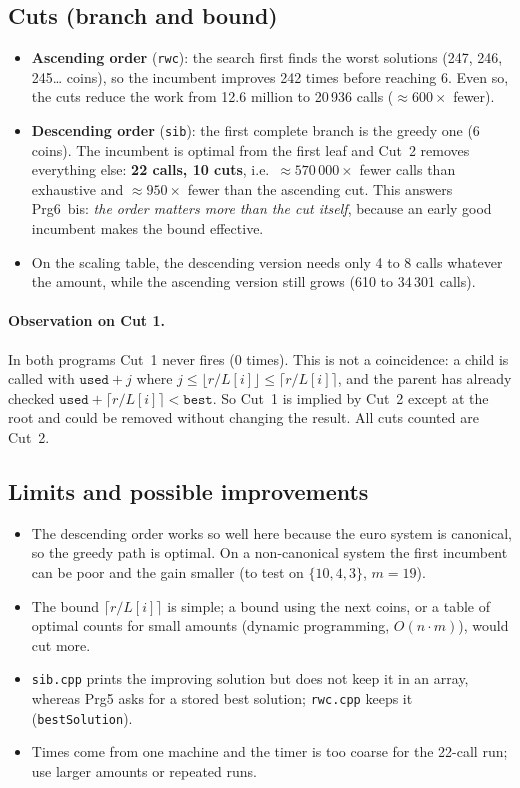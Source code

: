 \documentclass[11pt,a4paper]{article}
\begin{document}
\subsection{Cuts (branch and bound)}
\begin{itemize}
  \item \textbf{Ascending order} (\texttt{rwc}): the search first finds the worst solutions (247, 246, 245\dots{} coins), so the incumbent improves 242 times before reaching 6. Even so, the cuts reduce the work from 12.6 million to 20\,936 calls ($\approx 600\times$ fewer).
  \item \textbf{Descending order} (\texttt{sib}): the first complete branch is the greedy one (6 coins). The incumbent is optimal from the first leaf and Cut~2 removes everything else: \textbf{22 calls, 10 cuts}, i.e.\ $\approx 570\,000\times$ fewer calls than exhaustive and $\approx 950\times$ fewer than the ascending cut. This answers Prg6~bis: \emph{the order matters more than the cut itself}, because an early good incumbent makes the bound effective.
  \item On the scaling table, the descending version needs only 4 to 8 calls whatever the amount, while the ascending version still grows (610 to 34\,301 calls).
\end{itemize}

\paragraph{Observation on Cut 1.} In both programs Cut~1 never fires (0 times). This is not a coincidence: a child is called with $\texttt{used}+j$ where $j\le\lfloor r/L[i]\rfloor\le\lceil r/L[i]\rceil$, and the parent has already checked $\texttt{used}+\lceil r/L[i]\rceil<\texttt{best}$. So Cut~1 is implied by Cut~2 except at the root and could be removed without changing the result. All cuts counted are Cut~2.

\subsection{Limits and possible improvements}
\begin{itemize}
  \item The descending order works so well here because the euro system is canonical, so the greedy path is optimal. On a non-canonical system the first incumbent can be poor and the gain smaller (to test on $\{10,4,3\}$, $m=19$).
  \item The bound $\lceil r/L[i]\rceil$ is simple; a bound using the next coins, or a table of optimal counts for small amounts (dynamic programming, $O(n\cdot m)$), would cut more.
  \item \texttt{sib.cpp} prints the improving solution but does not keep it in an array, whereas Prg5 asks for a stored best solution; \texttt{rwc.cpp} keeps it (\texttt{bestSolution}).
  \item Times come from one machine and the timer is too coarse for the 22-call run; use larger amounts or repeated runs.
\end{itemize}
\end{document}
